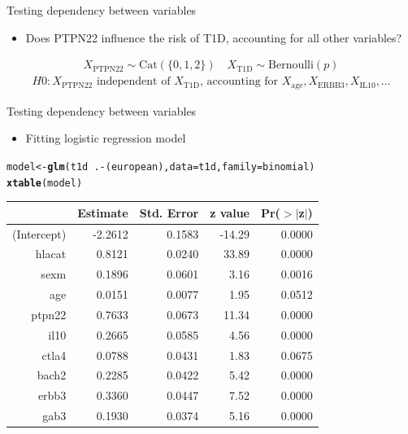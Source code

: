 \documentclass{beamer}\usepackage[]{graphicx}\usepackage[]{color}
\makeatletter
\newcommand{\hlopt}[1]{\textcolor[rgb]{0,0,0}{#1}}%
\newcommand{\hlstd}[1]{\textcolor[rgb]{0.345,0.345,0.345}{#1}}%
\newcommand{\hlkwb}[1]{\textcolor[rgb]{0.69,0.353,0.396}{#1}}%
\newcommand{\hlkwc}[1]{\textcolor[rgb]{0.333,0.667,0.333}{#1}}%
\newcommand{\hlkwd}[1]{\textcolor[rgb]{0.737,0.353,0.396}{\textbf{#1}}}%
\newenvironment{kframe}{%
 \def\at@end@of@kframe{}%
 \ifinner\ifhmode%
  \def\at@end@of@kframe{\end{minipage}}%
  \begin{minipage}{\columnwidth}%
 \fi\fi%
 \def\FrameCommand##1{\hskip\@totalleftmargin \hskip-\fboxsep
 \colorbox{shadecolor}{##1}\hskip-\fboxsep
     \hskip-\linewidth \hskip-\@totalleftmargin \hskip\columnwidth}%
 \MakeFramed {\advance\hsize-\width
   \@totalleftmargin\z@ \linewidth\hsize
   \@setminipage}}%
 {\par\unskip\endMakeFramed%
 \at@end@of@kframe}
\makeatother
\begin{document}
\begin{frame}[fragile]{Testing dependency between variables}
  \begin{itemize}
    \item Does PTPN22 influence the risk of T1D, accounting for all other
      variables?
  \end{itemize}
  \begin{align*}
    X_\text{PTPN22} \sim \text{Cat}(\{0, 1, 2\}) \quad
    X_\text{T1D} \sim \text{Bernoulli}(p)
  \end{align*}
  \begin{align*}
    H0: X_\text{PTPN22} \text{ independent of } X_\text{T1D} 
    \text{, accounting for } X_\text{age}, X_\text{ERBB3}, X_\text{IL10}, \dots
  \end{align*}
\end{frame}

\begin{frame}[fragile]{Testing dependency between variables}
  \begin{itemize}
    \item Fitting logistic regression model
  \end{itemize}
\begin{kframe}
\begin{alltt}
\hlstd{model} \hlkwb{<-} \hlkwd{glm}\hlstd{(t1d} \hlopt{~} \hlstd{.}\hlopt{-}\hlstd{(european),} \hlkwc{data}\hlstd{=t1d,} \hlkwc{family}\hlstd{=binomial)}
\hlkwd{xtable}\hlstd{(model)}
\end{alltt}
\end{kframe}%
\begin{table}[ht]
\centering
\begin{tabular}{rrrrr}
  \hline
 & Estimate & Std. Error & z value & Pr($>$$|$z$|$) \\ 
  \hline
(Intercept) & -2.2612 & 0.1583 & -14.29 & 0.0000 \\ 
  hlacat & 0.8121 & 0.0240 & 33.89 & 0.0000 \\ 
  sexm & 0.1896 & 0.0601 & 3.16 & 0.0016 \\ 
  age & 0.0151 & 0.0077 & 1.95 & 0.0512 \\ 
  ptpn22 & 0.7633 & 0.0673 & 11.34 & 0.0000 \\ 
  il10 & 0.2665 & 0.0585 & 4.56 & 0.0000 \\ 
  ctla4 & 0.0788 & 0.0431 & 1.83 & 0.0675 \\ 
  bach2 & 0.2285 & 0.0422 & 5.42 & 0.0000 \\ 
  erbb3 & 0.3360 & 0.0447 & 7.52 & 0.0000 \\ 
  gab3 & 0.1930 & 0.0374 & 5.16 & 0.0000 \\ 
   \hline
\end{tabular}
\end{table}

\end{frame}
\end{document}
